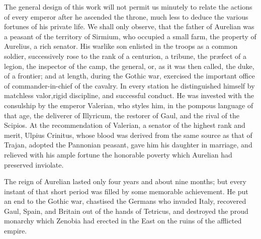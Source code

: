 

The general design of this work will not permit us minutely to
relate the actions of every emperor after he ascended the throne,
much less to deduce the various fortunes of his private life. We
shall only observe, that the father of Aurelian was a peasant of
the territory of Sirmium, who occupied a small farm, the property
of Aurelius, a rich senator. His warlike son enlisted in the
troops as a common soldier, successively rose to the rank of a
centurion, a tribune, the præfect of a legion, the inspector of
the camp, the general, or, as it was then called, the duke, of a
frontier; and at length, during the Gothic war, exercised the
important office of commander-in-chief of the cavalry. In every
station he distinguished himself by matchless valor,\footnotemark[17] rigid
discipline, and successful conduct. He was invested with the
consulship by the emperor Valerian, who styles him, in the
pompous language of that age, the deliverer of Illyricum, the
restorer of Gaul, and the rival of the Scipios. At the
recommendation of Valerian, a senator of the highest rank and
merit, Ulpius Crinitus, whose blood was derived from the same
source as that of Trajan, adopted the Pannonian peasant, gave him
his daughter in marriage, and relieved with his ample fortune the
honorable poverty which Aurelian had preserved inviolate.\footnotemark[18]



The reign of Aurelian lasted only four years and about nine
months; but every instant of that short period was filled by some
memorable achievement. He put an end to the Gothic war, chastised
the Germans who invaded Italy, recovered Gaul, Spain, and Britain
out of the hands of Tetricus, and destroyed the proud monarchy
which Zenobia had erected in the East on the ruins of the
afflicted empire.


